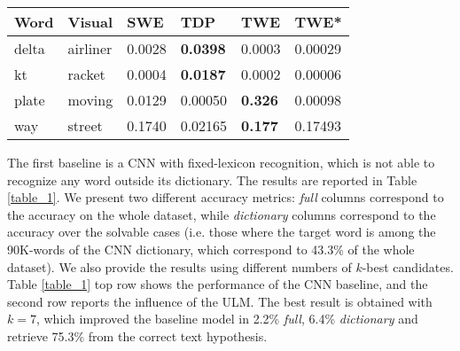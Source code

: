 \documentclass[phd,tocprelim]{cornell}
\begin{document}
{\begin{table}[t]
\begin{center}
\begin{threeparttable}

\begin{tabular}{|l|l|l|l|l|l|}
\hline 
 Word &  Visual    &  SWE &  TDP &  TWE &  TWE* \\
\hline \hline
delta     & airliner &  0.0028  & \textbf{0.0398}  & 0.0003  &  0.00029     \\
kt         & racket  & 0.0004 &   \textbf{0.0187} &   0.0002 & 0.00006 \\ 
plate     & moving   &  0.0129  & 0.00050  & \textbf{0.326}  &  0.00098       \\
way       & street   & 0.1740    & 0.02165  &   \textbf{0.177}       &  0.17493  \\ 
\hline
\end{tabular}




\end{threeparttable}
\end{center}

 \label{table_3} 
 \end{table}



The first baseline is a CNN \cite{Max:16} with fixed-lexicon recognition, which is not able to recognize any word outside its dictionary. The results are reported in Table \ref{table_1}. We present two different accuracy metrics: \textit{full} columns correspond to the accuracy on the whole dataset, while \textit{dictionary} columns correspond to the accuracy over the solvable cases (i.e. those where the target word is among the 90K-words of the CNN dictionary, which correspond to 43.3\% of the whole dataset). 
We also provide the results using different numbers of $k$-best candidates. Table \ref{table_1} top  row shows the performance of the CNN baseline, and the second row reports the influence of the ULM. The best result is obtained with $k=7$, which improved the baseline model in 2.2\% \textit{full}, 6.4\%  \textit{dictionary} and retrieve 75.3\% from the correct text hypothesis.
}
\end{document}
